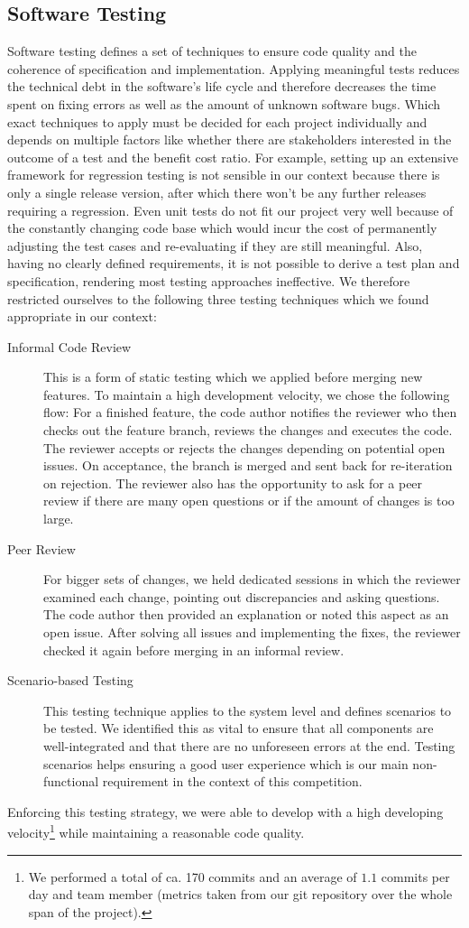 \subsection{Software Testing}\label{subsec:sw_testing}
Software testing defines a set of techniques to ensure code quality and the coherence of specification and implementation.
Applying meaningful tests reduces the technical debt in the software's life cycle and therefore decreases the time spent on fixing errors as well as the amount of unknown software bugs.
Which exact techniques to apply must be decided for each project individually and depends on multiple factors like whether there are stakeholders interested in the outcome of a test and the benefit cost ratio.
For example, setting up an extensive framework for regression testing is not sensible in our context because there is only a single release version, after which there won't be any further releases requiring a regression.
Even unit tests do not fit our project very well because of the constantly changing code base which would incur the cost of permanently adjusting the test cases and re-evaluating if they are still meaningful.
Also, having no clearly defined requirements, it is not possible to derive a test plan and specification, rendering most testing approaches ineffective.
We therefore restricted ourselves to the following three testing techniques which we found appropriate in our context:
\begin{description}
	\item[Informal Code Review] This is a form of static testing which we applied before merging new features. To maintain a high development velocity, we chose the following flow: For a finished feature, the code author notifies the reviewer who then checks out the feature branch, reviews the changes and executes the code. The reviewer accepts or rejects the changes depending on potential open issues. On acceptance, the branch is merged and sent back for re-iteration on rejection. The reviewer also has the opportunity to ask for a peer review if there are many open questions or if the amount of changes is too large.
	\item[Peer Review] For bigger sets of changes, we held dedicated sessions in which the reviewer examined each change, pointing out discrepancies and asking questions. The code author then provided an explanation or noted this aspect as an open issue. After solving all issues and implementing the fixes, the reviewer checked it again before merging in an informal review.
	\item[Scenario-based Testing] This testing technique applies to the system level and defines scenarios to be tested. We identified this as vital to ensure that all components are well-integrated and that there are no unforeseen errors at the end. Testing scenarios helps ensuring a good user experience which is our main non-functional requirement in the context of this competition. 
\end{description}
Enforcing this testing strategy, we were able to develop with a high developing velocity\footnote{We performed a total of ca. 170 commits and an average of $1.1$ commits per day and team member (metrics taken from our git repository over the whole span of the project).} while maintaining a reasonable code quality.
